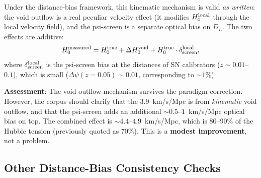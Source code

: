 \documentclass[11pt]{article}
\newcommand{\Dpsi}{\Delta\psi}
\begin{document}
Under the distance-bias framework, this kinematic mechanism is valid
\emph{as written}: the void outflow is a real peculiar velocity effect
(it modifies $H_0^{\rm local}$ through the local velocity field), and
the psi-screen is a separate optical bias on $D_L$.  The two effects
are additive:
\begin{equation}
H_0^{\rm measured} = H_0^{\rm true} + \Delta H_0^{\rm void}
  + H_0^{\rm true}\cdot\delta_{\rm screen}^{\rm local},
\end{equation}
where $\delta_{\rm screen}^{\rm local}$ is the psi-screen bias at the
distances of SN calibrators ($z \sim 0.01$--$0.1$), which is small
($\Dpsi(z = 0.05) \sim 0.01$, corresponding to $\sim 1\%$).

\textbf{Assessment}: The void-outflow mechanism survives the paradigm
correction.  However, the corpus should clarify that the 3.9~km/s/Mpc
is from \emph{kinematic} void outflow, and that the psi-screen adds
an additional $\sim 0.5$--$1$~km/s/Mpc optical bias on top.  The
combined effect is $\sim 4.4$--$4.9$~km/s/Mpc, which is 80--90\% of
the Hubble tension (previously quoted as 70\%).  This is a
\textbf{modest improvement}, not a problem.

\subsection{Other Distance-Bias Consistency Checks}
\end{document}
